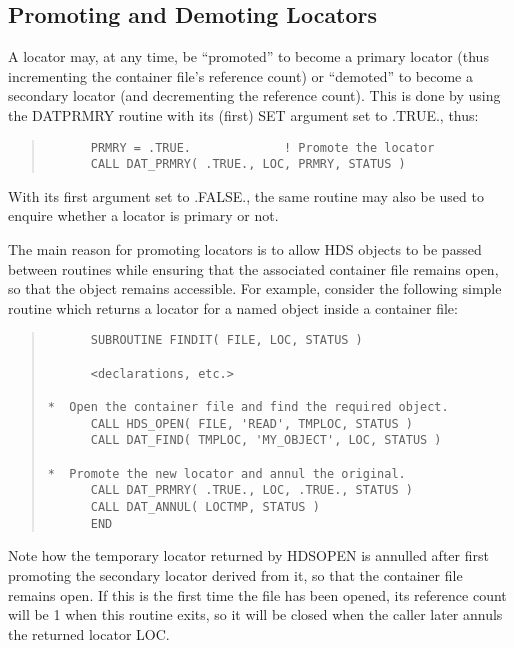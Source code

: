 \documentclass[twoside,11pt]{article}
\newcommand{\htmlref}[2]{#1}
\newcommand{\xlabel}[1]{}
\renewcommand{\_}{\texttt{\symbol{95}}}
\newcommand{\qt}[1]{``#1''}
\newcommand{\qt}[1]{{\tt{"}}#1{\tt{"}}}
\begin{document}
\subsection{\xlabel{promoting_and_demoting_locators}\label{sect:promote}Promoting and Demoting Locators}

A locator may, at any time, be \qt{promoted} to become a
\htmlref{primary}{sect:primary} locator (thus incrementing the
container file's \htmlref{reference count}{sect:refct}) or
\qt{demoted} to become a secondary locator (and decrementing the
reference count). This is done by using the
\htmlref{DAT\_PRMRY}{DAT_PRMRY} routine with its (first) SET argument
set to .TRUE., thus:

\small
\begin{quote}
\begin{verbatim}
      PRMRY = .TRUE.             ! Promote the locator
      CALL DAT_PRMRY( .TRUE., LOC, PRMRY, STATUS )
\end{verbatim}
\end{quote}
\normalsize

With its first argument set to .FALSE., the same routine may also be
used to enquire whether a locator is primary or not.

The main reason for promoting locators is to allow HDS objects to be
passed between routines while ensuring that the associated container
file remains open, so that the object remains accessible. For example,
consider the following simple routine which returns a locator for a
named object inside a container file:

\small
\begin{quote}
\begin{verbatim}
      SUBROUTINE FINDIT( FILE, LOC, STATUS )

      <declarations, etc.>

*  Open the container file and find the required object.
      CALL HDS_OPEN( FILE, 'READ', TMPLOC, STATUS )
      CALL DAT_FIND( TMPLOC, 'MY_OBJECT', LOC, STATUS )

*  Promote the new locator and annul the original.
      CALL DAT_PRMRY( .TRUE., LOC, .TRUE., STATUS )
      CALL DAT_ANNUL( LOCTMP, STATUS )
      END
\end{verbatim}
\end{quote}
\normalsize

Note how the temporary locator returned by
\htmlref{HDS\_OPEN}{HDS_OPEN} is \htmlref{annulled}{sect:annul} after
first promoting the secondary locator derived from it, so that the
container file remains open. If this is the first time the file has
been opened, its reference count will be 1 when this routine exits, so
it will be closed when the caller later annuls the returned locator
LOC.
\end{document}
